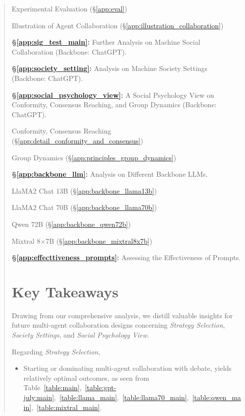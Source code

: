 \documentclass[11pt]{article}
\begin{document}
\begin{abstract}
\quad\quad Experimental Evaluation (\S\ref{app:eval})

\quad\quad Illustration of Agent Collaboration (\S\ref{app:illustration_collaboration})


\noindent
\textbf{\S\ref{app:sig_test_main}:} Further Analysis on Machine Social Collaboration (Backbone: ChatGPT). 


\noindent
\textbf{\S\ref{app:society_setting}:} Analysis on Machine Society Settings (Backbone: ChatGPT). 


\noindent
\textbf{\S\ref{app:social_psychology_view}:} A Social Psychology View on Conformity, Consensus Reaching, and Group Dynamics (Backbone: ChatGPT). 

\quad\quad Conformity, Consensus Reaching (\S\ref{app:detail_conformity_and_consensus})

\quad\quad Group Dynamics (\S\ref{app:principles_group_dynamics})



\noindent
\textbf{\S\ref{app:backbone_llm}:} Analysis on Different Backbone LLMs. 

\quad\quad LlaMA2 Chat 13B (\S\ref{app:backbone_llama13b})

\quad\quad LlaMA2 Chat 70B  (\S\ref{app:backbone_llama70b})

\quad\quad Qwen 72B (\S\ref{app:backbone_qwen72b}) 

\quad\quad Mixtral 8$\times$7B (\S\ref{app:backbone_mixtral8x7b})


\noindent
\textbf{\S\ref{app:effecttiveness_prompts}:} Assessing the Effectiveness of Prompts. 





\section{Key Takeaways} %
\label{app:insights}

Drawing from our comprehensive analysis, we distill valuable insights for future multi-agent collaboration designs concerning \emph{Strategy Selection}, \emph{Society Settings}, and \emph{Social Psychology View}. 

Regarding \textit{Strategy Selection}, 
\begin{itemize}
    \item Starting or dominating multi-agent collaboration with debate, yields relatively optimal outcomes, as seen from Table~\ref{table:main},~\ref{table:gpt-july:main},~\ref{table:llama_main},~\ref{table:llama70_main},~\ref{table:qwen_main},~\ref{table:mixtral_main}. 


\end{itemize}
\end{abstract}
\end{document}
